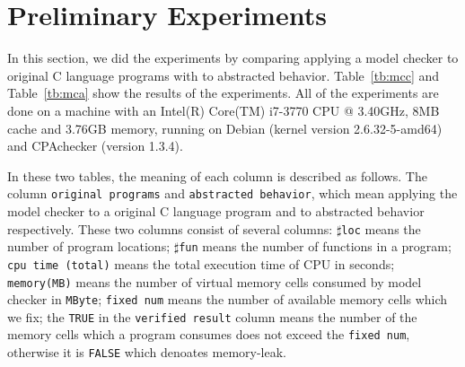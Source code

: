 \section{Preliminary Experiments}
\label{sec:experiment}
In this section, we did the experiments by comparing applying a model
checker to original C language programs with to abstracted
behavior. Table~\ref{tb:mcc} and Table~\ref{tb:mca} show the results
of the experiments. All of the experiments are done on a machine with
an Intel(R) Core(TM) i7-3770 CPU @ 3.40GHz, 8MB cache and 3.76GB memory, running
on Debian (kernel version 2.6.32-5-amd64) and CPAchecker (version 1.3.4).

In these two tables, the meaning of each column is described as
follows. The column \texttt{original programs} and \texttt{abstracted
  behavior}, which mean applying the model checker to a original C
language program and to abstracted behavior respectively. These two
columns consist of several columns: $\sharp$\texttt{loc} means the
number of program locations; $\sharp$\texttt{fun} means the number of
functions in a program; \texttt{cpu time (total)} means the total
execution time of CPU in seconds; \texttt{memory(MB)} means the number
of virtual memory cells consumed by model checker in \texttt{MByte};
\texttt{fixed num} means the number of available memory cells which we
fix; the \texttt{TRUE} in the \texttt{verified result} column means
the number of the memory cells which a program consumes does not
exceed the \texttt{fixed num}, otherwise it is \texttt{FALSE} which
denoates memory-leak.

